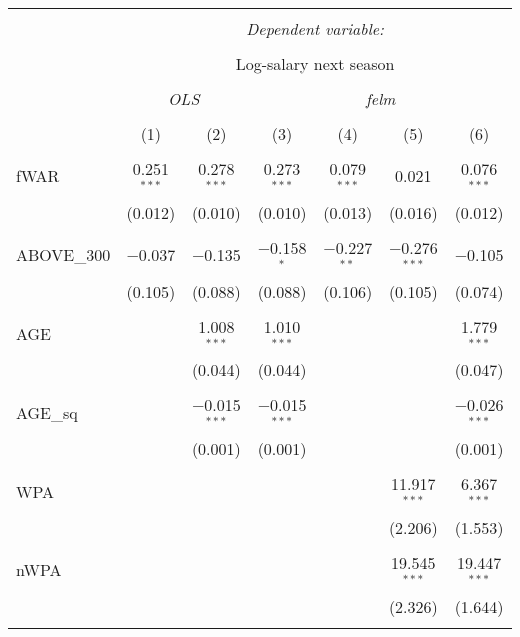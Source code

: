 
\begin{table}[!htbp] \centering
  \caption{}
  \label{}
  \scriptsize
\begin{tabular}{@{\extracolsep{5pt}}lcccccc}
\\[-1.8ex]\hline
\hline \\[-1.8ex]
 & \multicolumn{6}{c}{\textit{Dependent variable:}} \\
\cline{2-7}
\\[-1.8ex] & \multicolumn{6}{c}{Log-salary next season} \\
\\[-1.8ex] & \multicolumn{2}{c}{\textit{OLS}} & \multicolumn{4}{c}{\textit{felm}} \\
\\[-1.8ex] & (1) & (2) & (3) & (4) & (5) & (6)\\
\hline \\[-1.8ex]
 fWAR & 0.251$^{***}$ & 0.278$^{***}$ & 0.273$^{***}$ & 0.079$^{***}$ & 0.021 & 0.076$^{***}$ \\
  & (0.012) & (0.010) & (0.010) & (0.013) & (0.016) & (0.012) \\
  & & & & & & \\
 ABOVE\_300 & $-$0.037 & $-$0.135 & $-$0.158$^{*}$ & $-$0.227$^{**}$ & $-$0.276$^{***}$ & $-$0.105 \\
  & (0.105) & (0.088) & (0.088) & (0.106) & (0.105) & (0.074) \\
  & & & & & & \\
 AGE &  & 1.008$^{***}$ & 1.010$^{***}$ &  &  & 1.779$^{***}$ \\
  &  & (0.044) & (0.044) &  &  & (0.047) \\
  & & & & & & \\
 AGE\_sq &  & $-$0.015$^{***}$ & $-$0.015$^{***}$ &  &  & $-$0.026$^{***}$ \\
  &  & (0.001) & (0.001) &  &  & (0.001) \\
  & & & & & & \\
 WPA &  &  &  &  & 11.917$^{***}$ & 6.367$^{***}$ \\
  &  &  &  &  & (2.206) & (1.553) \\
  & & & & & & \\
 nWPA &  &  &  &  & 19.545$^{***}$ & 19.447$^{***}$ \\
  &  &  &  &  & (2.326) & (1.644) \\
  & & & & & & \\

\end{tabular}
\end{table}
